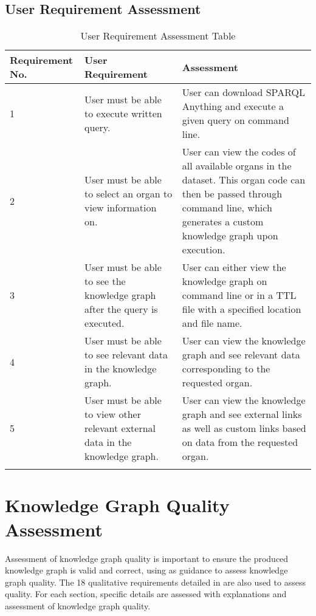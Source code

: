 \subsection{User Requirement Assessment}

\begin{longtable}{|p{2.25cm}|p{4.5cm}|p{6.5cm}|}
\hline
\textbf{Requirement No.} & \textbf{User Requirement} & \textbf{Assessment}\\
\hline

1& 
User must be able to execute written query. &
User can download SPARQL Anything \cite{sparqlanythinggithub} and execute a given query on command line. \\
\hline

2&
User must be able to select an organ to view information on. &
User can view the codes of all available organs in the dataset. This organ code can then be passed through command line, which generates a custom knowledge graph upon execution. \\
\hline

3&
User must be able to see the knowledge graph after the query is executed. &
User can either view the knowledge graph on command line or in a TTL file with a specified location and file name. \\
\hline

4&
User must be able to see relevant data in the knowledge graph. &
User can view the knowledge graph and see relevant data corresponding to the requested organ. \\
\hline

5&
User must be able to view other relevant external data in the knowledge graph. &
User can view the knowledge graph and see external links as well as custom links based on data from the requested organ. \\ 
\hline

\caption{User Requirement Assessment Table}
\end{longtable}
\vspace{-1.1cm}

\section{Knowledge Graph Quality Assessment}
\hspace{0.5cm} Assessment of knowledge graph quality is important to ensure the produced knowledge graph is valid and correct, using \cite{knowledgegraphevaulationbook} as guidance to assess knowledge graph quality. The 18 qualitative requirements detailed in \cite{evaluationpaper} are also used to assess quality. For each section, specific details are assessed with explanations and assessment of knowledge graph quality. 

